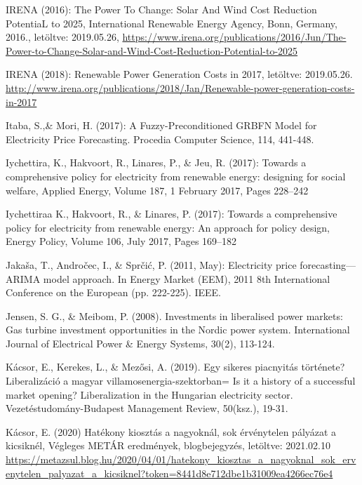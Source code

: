 \documentclass[twoside, magyar, showtrims]{corvinusphd}
\theoremstyle{plain}
\theoremstyle{remark}
\theoremstyle{definition}
\begin{document}
\begin{thebibliography}{99}
IRENA (2016): The Power To Change: Solar And Wind Cost Reduction PotentiaL to 2025, International Renewable Energy Agency, Bonn, Germany, 2016., letöltve: 2019.05.26,
\url{https://www.irena.org/publications/2016/Jun/The-Power-to-Change-Solar-and-Wind-Cost-Reduction-Potential-to-2025}

IRENA (2018): Renewable Power Generation Costs in 2017, letöltve: 2019.05.26.
\url{http://www.irena.org/publications/2018/Jan/Renewable-power-generation-costs-in-2017}

Itaba, S.,\& Mori, H. (2017): A Fuzzy-Preconditioned GRBFN Model for Electricity Price Forecasting. Procedia Computer Science, 114, 441-448.

Iychettira, K., Hakvoort, R., Linares, P., \& Jeu, R. (2017): Towards a comprehensive policy for electricity from renewable energy: designing for social welfare, Applied Energy, Volume 187, 1 February 2017, Pages 228–242

Iychettiraa K., Hakvoort, R., \& Linares, P. (2017): Towards a comprehensive policy for electricity from renewable energy: An approach for policy design, Energy Policy, Volume 106, July 2017, Pages 169–182

Jakaša, T., Andročec, I., \& Sprčić, P. (2011, May): Electricity price forecasting—ARIMA model approach. In Energy Market (EEM), 2011 8th International Conference on the European (pp. 222-225). IEEE.

Jensen, S. G., \& Meibom, P. (2008). Investments in liberalised power markets: Gas turbine investment opportunities in the Nordic power system. International Journal of Electrical Power \& Energy Systems, 30(2), 113-124.

Kácsor, E., Kerekes, L., \& Mezősi, A. (2019). Egy sikeres piacnyitás története? Liberalizáció a magyar villamosenergia-szektorban= Is it a history of a successful market opening? Liberalization in the Hungarian electricity sector. Vezetéstudomány-Budapest Management Review, 50(ksz.), 19-31.

Kácsor, E. (2020) Hatékony kiosztás a nagyoknál, sok érvénytelen pályázat a kicsiknél, Végleges METÁR eredmények, blogbejegyzés, letöltve: 2021.02.10
\url{https://metazsul.blog.hu/2020/04/01/hatekony\_kiosztas\_a\_nagyoknal\_sok\_ervenytelen\_palyazat\_a\_kicsiknel?token=8441d8e712dbe1b31009ea4266ec76e4}


\end{thebibliography}
\end{document}
